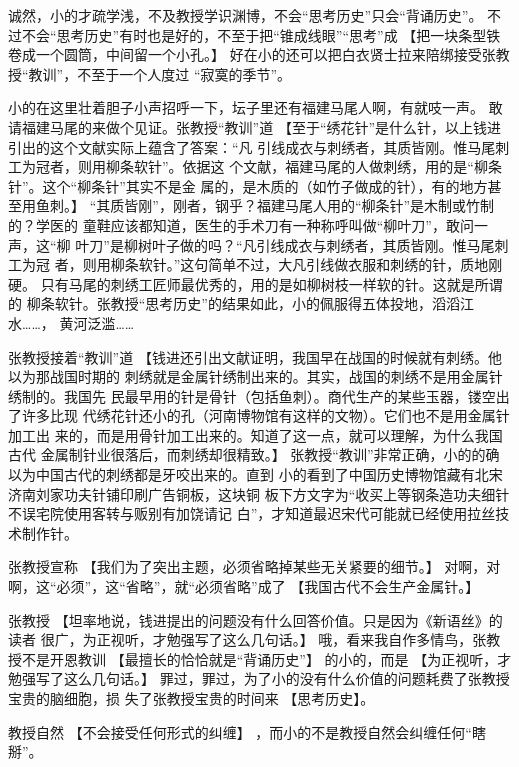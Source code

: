 诚然，小的才疏学浅，不及教授学识渊博，不会“思考历史”只会“背诵历史”。
不过不会“思考历史”有时也是好的，不至于把“锥成线眼”“思考”成
\fangsong
【把一块条型铁卷成一个圆筒，中间留一个小孔。】
\normalfont
好在小的还可以把白衣贤士拉来陪绑接受张教授“教训”，不至于一个人度过
“寂寞的季节”。

小的在这里壮着胆子小声招呼一下，坛子里还有福建马尾人啊，有就吱一声。
敢请福建马尾的来做个见证。张教授“教训”道
\fangsong
【至于“绣花针”是什么针，以上钱进引出的这个文献实际上蕴含了答案：“凡
引线成衣与刺绣者，其质皆刚。惟马尾刺工为冠者，则用柳条软针”。依据这
个文献，福建马尾的人做刺绣，用的是“柳条针”。这个“柳条针”其实不是金
属的，是木质的（如竹子做成的针），有的地方甚至用鱼刺。】
\normalfont
“其质皆刚”，刚者，钢乎？福建马尾人用的“柳条针”是木制或竹制的？学医的
童鞋应该都知道，医生的手术刀有一种称呼叫做“柳叶刀”，敢问一声，这“柳
叶刀”是柳树叶子做的吗？“凡引线成衣与刺绣者，其质皆刚。惟马尾刺工为冠
者，则用柳条软针。”这句简单不过，大凡引线做衣服和刺绣的针，质地刚硬。
只有马尾的刺绣工匠师最优秀的，用的是如柳树枝一样软的针。这就是所谓的
柳条软针。张教授“思考历史”的结果如此，小的佩服得五体投地，滔滔江水……，
黄河泛滥……

张教授接着“教训”道
\fangsong
【钱进还引出文献证明，我国早在战国的时候就有刺绣。他以为那战国时期的
刺绣就是金属针绣制出来的。其实，战国的刺绣不是用金属针绣制的。我国先
民最早用的针是骨针（包括鱼刺）。商代生产的某些玉器，镂空出了许多比现
代绣花针还小的孔（河南博物馆有这样的文物）。它们也不是用金属针加工出
来的，而是用骨针加工出来的。知道了这一点，就可以理解，为什么我国古代
金属制针业很落后，而刺绣却很精致。】
\normalfont
张教授“教训”非常正确，小的的确以为中国古代的刺绣都是牙咬出来的。直到
小的看到了中国历史博物馆藏有北宋济南刘家功夫针铺印刷广告铜板，这块铜
板下方文字为“收买上等钢条造功夫细针不误宅院使用客转与贩别有加饶请记
白”，才知道最迟宋代可能就已经使用拉丝技术制作针。

张教授宣称
\fangsong
【我们为了突出主题，必须省略掉某些无关紧要的细节。】
\normalfont
对啊，对啊，这“必须”，这“省略”，就“必须省略”成了
\fangsong
【我国古代不会生产金属针。】

\normalfont
张教授
\fangsong
【坦率地说，钱进提出的问题没有什么回答价值。只是因为《新语丝》的读者
很广，为正视听，才勉强写了这么几句话。】
\normalfont
哦，看来我自作多情鸟，张教授不是开恩教训
\fangsong
【最擅长的恰恰就是“背诵历史”】
\normalfont
的小的，而是
\fangsong
【为正视听，才勉强写了这么几句话。】
\normalfont
罪过，罪过，为了小的没有什么价值的问题耗费了张教授宝贵的脑细胞，损
失了张教授宝贵的时间来
\fangsong
【思考历史】。

\normalfont
教授自然
\fangsong
【不会接受任何形式的纠缠】
\normalfont
，而小的不是教授自然会纠缠任何“瞎掰”。
